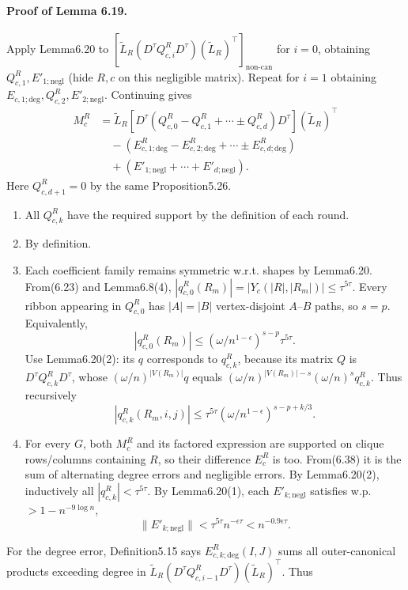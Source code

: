 \documentclass[10pt,a4paper]{article}
\begin{document}
\paragraph{Proof of Lemma 6.19.} Apply Lemma6.20 to $[\widetilde L_R(D^\tau Q_{c,i}^R D^\tau)(\widetilde L_R)^\top]_{\mathrm{non\text{-}can}}$ for $i=0$, obtaining $Q_{c,1}^R,E'_{1;\mathrm{negl}}$ (hide $R,c$ on this negligible matrix). Repeat for $i=1$ obtaining $E_{c,1;\mathrm{deg}},Q_{c,2}^R,E'_{2;\mathrm{negl}}$. Continuing gives
\begin{align*}M_c^R&=\widetilde L_R[D^\tau(Q_{c,0}^R-Q_{c,1}^R+\cdots\pm Q_{c,d}^R)D^\tau](\widetilde L_R)^\top\\&\quad-(E_{c,1;\mathrm{deg}}^R-E_{c,2;\mathrm{deg}}^R+\cdots\pm E_{c,d;\mathrm{deg}}^R)\\&\quad+(E'_{1;\mathrm{negl}}+\cdots+E'_{d;\mathrm{negl}}).\tag{6.38}\end{align*}
Here $Q_{c,d+1}^R=0$ by the same Proposition5.26.
\begin{enumerate}\item All $Q_{c,k}^R$ have the required support by the definition of each round.
\item By definition.
\item Each coefficient family remains symmetric w.r.t. shapes by Lemma6.20. From(6.23) and Lemma6.8(4), $|q_{c,0}^R(R_m)|=|Y_c(|R|,|R_m|)|\le\tau^{5\tau}$. Every ribbon appearing in $Q_{c,0}^R$ has $|A|=|B|$ vertex-disjoint $A$--$B$ paths, so $s=p$. Equivalently,
\[|q_{c,0}^R(R_m)|\le(\omega/n^{1-\epsilon})^{s-p}\tau^{5\tau}.\tag{6.39}\]
Use Lemma6.20(2): its $q$ corresponds to $q_{c,k}^R$, because its matrix $Q$ is $D^\tau Q_{c,k}^R D^\tau$, whose $(\omega/n)^{|V(R_m)|}q$ equals $(\omega/n)^{|V(R_m)|-s}(\omega/n)^s q_{c,k}^R$. Thus recursively
\[|q_{c,k}^R(R_m,i,j)|\le\tau^{5\tau}(\omega/n^{1-\epsilon})^{s-p+k/3}.\]
\item For every $G$, both $M_c^R$ and its factored expression are supported on clique rows/columns containing $R$, so their difference $E_c^R$ is too. From(6.38) it is the sum of alternating degree errors and negligible errors. By Lemma6.20(2), inductively all $|q_{c,k}^R|<\tau^{5\tau}$. By Lemma6.20(1), each $E'_{k;\mathrm{negl}}$ satisfies w.p. $>1-n^{-9\log n}$,
\[\|E'_{k;\mathrm{negl}}\|<\tau^{5\tau}n^{-\epsilon\tau}<n^{-0.9\epsilon\tau}.\]
\end{enumerate}
For the degree error, Definition5.15 says $E_{c,k;\mathrm{deg}}^R(I,J)$ sums all outer-canonical products exceeding degree in $\widetilde L_R(D^\tau Q_{c,i-1}^R D^\tau)(\widetilde L_R)^\top$. Thus
\end{document}
